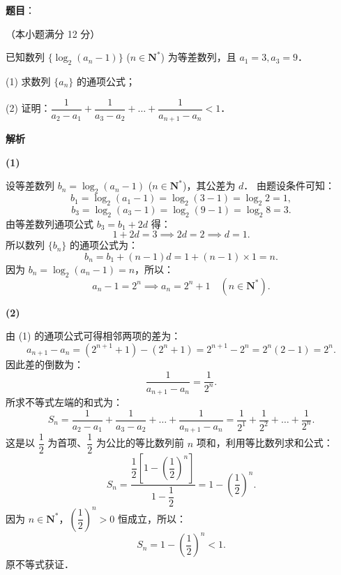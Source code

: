 \begin{answer}

\textbf{题目}：

（本小题满分 12 分）

已知数列 $\{\log_2(a_n - 1)\}$ ($n \in \mathbf{N}^*$) 为等差数列，且 $a_1 = 3, a_3 = 9$．

(1) 求数列 $\{a_n\}$ 的通项公式；

(2) 证明：$\dfrac{1}{a_2 - a_1} + \dfrac{1}{a_3 - a_2} + \dots + \dfrac{1}{a_{n+1} - a_n} < 1$．

\textbf{解析}

\textbf{(1)}

设等差数列 $b_n = \log_2(a_n - 1)$ ($n \in \mathbf{N}^*$)，其公差为 $d$．
由题设条件可知：
\nopagebreak[4]
\[
b_1 = \log_2(a_1 - 1) = \log_2(3 - 1) = \log_2 2 = 1,
\]
\nopagebreak[4]
\[
b_3 = \log_2(a_3 - 1) = \log_2(9 - 1) = \log_2 8 = 3.
\]
由等差数列通项公式 $b_3 = b_1 + 2d$ 得：
\nopagebreak[4]
\[
1 + 2d = 3 \implies 2d = 2 \implies d = 1.
\]
所以数列 $\{b_n\}$ 的通项公式为：
\nopagebreak[4]
\[
b_n = b_1 + (n - 1)d = 1 + (n - 1) \times 1 = n.
\]
因为 $b_n = \log_2(a_n - 1) = n$，所以：
\nopagebreak[4]
\[
a_n - 1 = 2^n \implies a_n = 2^n + 1 \quad (n \in \mathbf{N}^*).
\]

\textbf{(2)}

由 (1) 的通项公式可得相邻两项的差为：
\nopagebreak[4]
\[
a_{n+1} - a_n = (2^{n+1} + 1) - (2^n + 1) = 2^{n+1} - 2^n = 2^n(2 - 1) = 2^n.
\]
因此差的倒数为：
\nopagebreak[4]
\[
\frac{1}{a_{n+1} - a_n} = \frac{1}{2^n}.
\]
所求不等式左端的和式为：
\nopagebreak[4]
\[
S_n = \frac{1}{a_2 - a_1} + \frac{1}{a_3 - a_2} + \dots + \frac{1}{a_{n+1} - a_n} = \frac{1}{2^1} + \frac{1}{2^2} + \dots + \frac{1}{2^n}.
\]
这是以 $\dfrac{1}{2}$ 为首项、$\dfrac{1}{2}$ 为公比的等比数列前 $n$ 项和，利用等比数列求和公式：
\nopagebreak[4]
\[
S_n = \frac{\dfrac{1}{2}\left[1 - \left(\dfrac{1}{2}\right)^n\right]}{1 - \dfrac{1}{2}} = 1 - \left(\frac{1}{2}\right)^n.
\]
因为 $n \in \mathbf{N}^*$，$\left(\dfrac{1}{2}\right)^n > 0$ 恒成立，所以：
\nopagebreak[4]
\[
S_n = 1 - \left(\frac{1}{2}\right)^n < 1.
\]
原不等式获证．



\end{answer}
